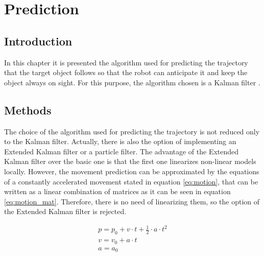
\chapter{Prediction} %
\label{chap:prediction}
\section{Introduction}
In this chapter it is presented the algorithm used for predicting the trajectory that the target object follows so that the robot can anticipate it and keep the object always on sight.
For this purpose, the algorithm chosen is a Kalman filter \cite{kalman}.

\section{Methods}
The choice of the algorithm used for predicting the trajectory is not reduced only to the Kalman filter. Actually, there is also the option of implementing an Extended Kalman filter or a particle filter. The advantage of the Extended Kalman filter over the basic one is that the first one linearizes non-linear models locally. However, the movement prediction can be approximated by the equations of a constantly accelerated movement stated in equation \ref{eq:motion}, that can be written as a linear combination of matrices as it can be seen in equation \ref{eq:motion_mat}. Therefore, there is no need of linearizing them, so the option of the Extended Kalman filter is rejected.

\begin{equation}
\begin{multlined}
p=p_{0}+v·t+\frac{1}{2}·a·t^{2} \\
v=v_{0}+a·t \\
a=a_{0} \\
\end{multlined}
\label{eq:motion}
\end{equation}


